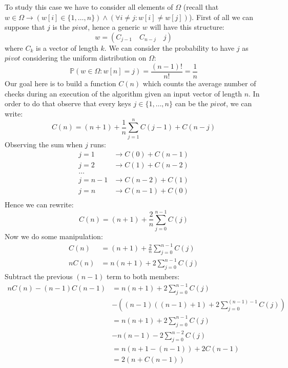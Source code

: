 To study this case we have to consider all
elements of $\Omega$ (recall that $w \in \Omega \rightarrow (w[i]\in
\{1,\ldots,n\}) \wedge (\forall i\not =j: w[i]\not=w[j])$). First of
all we can suppose that $j$ is the $pivot$, hence a generic $w$ will
have this structure:
\begin{displaymath}
  w = (C_{j-1} \quad C_{n-j} \quad j)
\end{displaymath}
where $C_k$ is a vector of length $k$. We can consider the
probability to have $j$ as $pivot$ considering the uniform
distribution on $\Omega$:
\begin{displaymath}
  \mathbb{P}\left(w\in\Omega: w[n]=j \right) =
  \frac{(n-1)!}{n!} =  \frac{1}{n}
\end{displaymath}
Our goal here is to build a function $C(n)$ which counts the average
number of checks during an execution of the algorithm given an input
vector of length $n$. In order to do that observe that every keys $j
\in \{1,\ldots,n\}$ can be the $pivot$, we can write:
\begin{displaymath}
  C(n) = (n+1) +  \frac{1}{n}\sum_{j=1}^{n}{C(j-1) + C(n-j)}
\end{displaymath}
Observing the sum when $j$ runs:
\begin{displaymath}
  \begin{split}
    j=1 &\rightarrow C(0) + C(n-1) \\
    j=2 &\rightarrow C(1) + C(n-2) \\
    \ldots& \\
    j=n-1 &\rightarrow C(n-2) + C(1) \\
    j=n &\rightarrow C(n-1) + C(0) \\
  \end{split}
\end{displaymath}
Hence we can rewrite:
\begin{displaymath}
  C(n) = (n+1) +  \frac{2}{n}\sum_{j=0}^{n-1}{C(j)}
\end{displaymath}
Now we do some manipulation:
\begin{displaymath}
  \begin{split}
    C(n) &= (n+1) + \frac{2}{n}\sum_{j=0}^{n-1}{C(j)}\\
    nC(n) &= n(n+1) + 2\sum_{j=0}^{n-1}{C(j)}
  \end{split}
\end{displaymath}
Subtract the previous $(n-1)$ term to both members:
\begin{displaymath}
  \begin{split}
    nC(n) -(n-1)C(n-1) &= n(n+1) + 2\sum_{j=0}^{n-1}{C(j)} \\
    &-\left((n-1)((n-1)+1) + 2\sum_{j=0}^{(n-1)-1}{C(j)}\right) \\
    &= n(n+1) + 2\sum_{j=0}^{n-1}{C(j)} \\
    &-n(n-1) - 2\sum_{j=0}^{n-2}{C(j)} \\
    &= n(n+1-(n-1)) + 2C(n-1) \\
    &= 2(n + C(n-1)) \\
  \end{split}
\end{displaymath}
